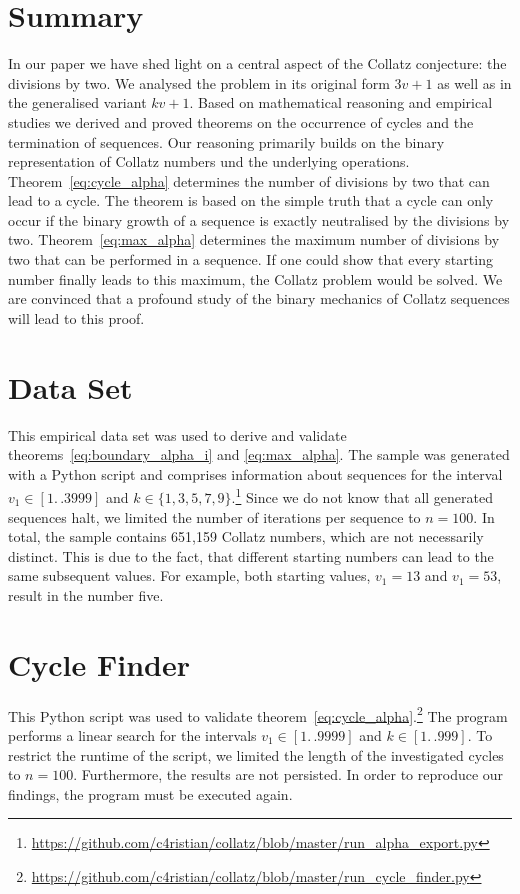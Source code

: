 \documentclass{SciPress_2015}
\renewcommand{\large}{\fontsize{14}{18pt}\selectfont}
\newcommand{\titleformat}{\sffamily\bfseries \large}						%
\begin{document}
\section{Summary}
In our paper we have shed light on a central aspect of the Collatz conjecture: the divisions by two. We analysed the problem in its original form $3v+1$ as well as in the generalised variant $kv+1$. Based on mathematical reasoning and empirical studies we derived and proved theorems on the occurrence of cycles and the termination of sequences. Our reasoning primarily builds on the binary representation of Collatz numbers und the underlying operations. Theorem~\ref{eq:cycle_alpha} determines the number of divisions by two that can lead to a cycle. The theorem is based on the simple truth that a cycle can only occur if the binary growth of a sequence is exactly neutralised by the divisions by two. Theorem~\ref{eq:max_alpha} determines the maximum number of divisions by two that can be performed in a sequence. If one could show that every starting number finally leads to this maximum, the Collatz problem would be solved. We are convinced that a profound study of the binary mechanics of Collatz sequences will lead to this proof.\\[1.5em]

\par\noindent
{\titleformat{Appendix}}
\section{Data Set}
\label{appx:data_set}
This empirical data set was used to derive and validate theorems~\ref{eq:boundary_alpha_i} and \ref{eq:max_alpha}. The sample was generated with a Python script and comprises information about sequences for the interval $v_1\in[1\mathrel{{.}\,{.}}3999]$ and $k\in\{1,3,5,7,9\}$.\footnote{\url{https://github.com/c4ristian/collatz/blob/master/run_alpha_export.py}} Since we do not know that all generated sequences halt, we limited the number of iterations per sequence to $n=100$. In total, the sample contains 651,159 Collatz numbers, which are not necessarily distinct. This is due to the fact, that different starting numbers can lead to the same subsequent values. For example, both starting values, $v_1=13$ and $v_1=53$, result in the number five.

\section{Cycle Finder}
\label{appx:cycle_finder}
This Python script was used to validate theorem~\ref{eq:cycle_alpha}.\footnote{\url{https://github.com/c4ristian/collatz/blob/master/run_cycle_finder.py}} The program performs a linear search for the intervals $v_1\in[1\mathrel{{.}\,{.}}9999]$ and $k\in[1\mathrel{{.}\,{.}}999]$. To restrict the runtime of the script, we limited the length of the investigated cycles to $n=100$. Furthermore, the results are not persisted. In order to reproduce our findings, the program must be executed again.
\end{document}
